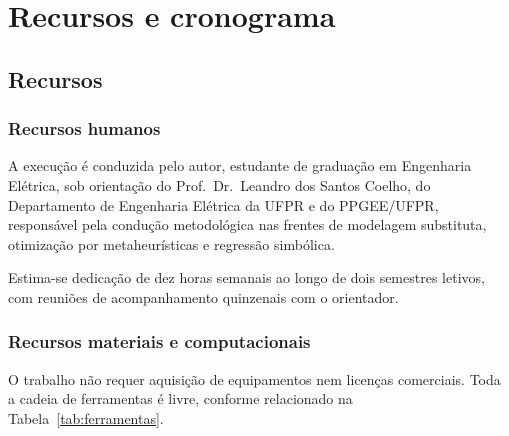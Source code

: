 \chapter{Recursos e cronograma}
\label{cap:recursos}

\section{Recursos}
\label{sec:recursos}

\subsection{Recursos humanos}

A execução é conduzida pelo autor, estudante de graduação em Engenharia Elétrica,
sob orientação do Prof.\ Dr.\ Leandro dos Santos Coelho, do Departamento de
Engenharia Elétrica da UFPR e do PPGEE/UFPR, responsável pela condução
metodológica nas frentes de modelagem substituta, otimização por metaheurísticas e
regressão simbólica.

Estima-se dedicação de dez horas semanais ao longo de dois semestres letivos,
com reuniões de acompanhamento quinzenais com o orientador.

\subsection{Recursos materiais e computacionais}

O trabalho não requer aquisição de equipamentos nem licenças comerciais. Toda a
cadeia de ferramentas é livre, conforme relacionado na
Tabela~\ref{tab:ferramentas}.

